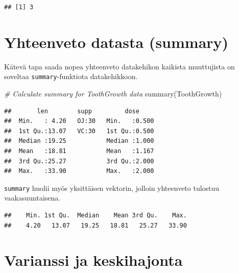 \documentclass[
]{book}
\newenvironment{Shaded}{\begin{snugshade}}{\end{snugshade}}
\newcommand{\CommentTok}[1]{\textcolor[rgb]{0.56,0.35,0.01}{\textit{#1}}}
\newcommand{\FunctionTok}[1]{\textcolor[rgb]{0.00,0.00,0.00}{#1}}
\newcommand{\NormalTok}[1]{#1}
\newcommand{\OtherTok}[1]{\textcolor[rgb]{0.56,0.35,0.01}{#1}}
\newcommand{\SpecialCharTok}[1]{\textcolor[rgb]{0.00,0.00,0.00}{#1}}
\begin{document}
\begin{verbatim}
## [1] 3
\end{verbatim}

\hypertarget{yhteenveto-datasta-summary}{%
\section{Yhteenveto datasta (summary)}\label{yhteenveto-datasta-summary}}

Kätevä tapa saada nopea yhteenveto datakehikon kaikista muuttujista on soveltaa \texttt{summary}-funktiota datakehikkoon.

\begin{Shaded}
\begin{Highlighting}[]
\CommentTok{\# Calculate summary for ToothGrowth data}
\FunctionTok{summary}\NormalTok{(ToothGrowth)}
\end{Highlighting}
\end{Shaded}

\begin{verbatim}
##       len        supp         dose      
##  Min.   : 4.20   OJ:30   Min.   :0.500  
##  1st Qu.:13.07   VC:30   1st Qu.:0.500  
##  Median :19.25           Median :1.000  
##  Mean   :18.81           Mean   :1.167  
##  3rd Qu.:25.27           3rd Qu.:2.000  
##  Max.   :33.90           Max.   :2.000
\end{verbatim}

\texttt{summary} huolii myös yksittäisen vektorin, jolloin yhteenveto tulostuu vaakasuuntaisena.

\begin{Shaded}
\end{Shaded}

\begin{verbatim}
##    Min. 1st Qu.  Median    Mean 3rd Qu.    Max. 
##    4.20   13.07   19.25   18.81   25.27   33.90
\end{verbatim}

\hypertarget{varianssi-ja-keskihajonta}{%
\section{Varianssi ja keskihajonta}\label{varianssi-ja-keskihajonta}}
\end{document}
